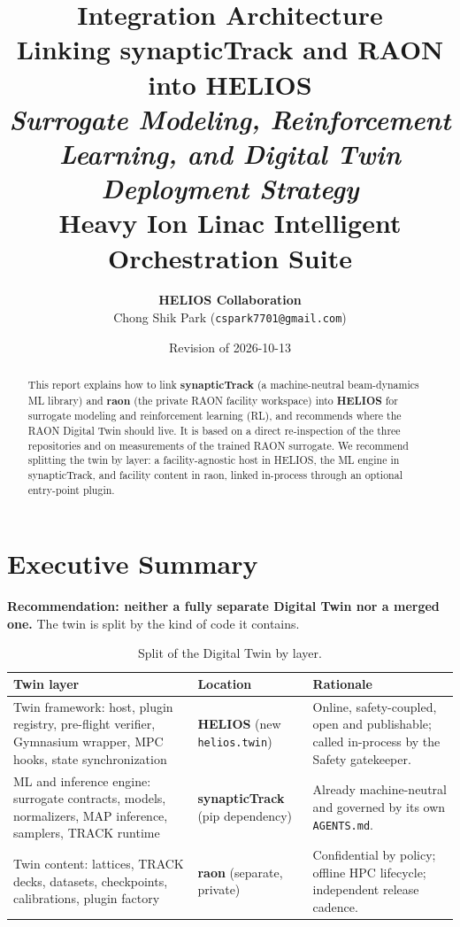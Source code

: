 \documentclass[11pt,a4paper]{article}
\title{
    \vspace{1cm}
    \Huge \textbf{Integration Architecture} \\
    \Large \textbf{Linking synapticTrack and RAON into HELIOS} \\
    \vspace{0.5cm}
    \normalsize \textit{Surrogate Modeling, Reinforcement Learning, and Digital Twin Deployment Strategy} \\
    \large Heavy Ion Linac Intelligent Orchestration Suite
    \vspace{1cm}
}
\author{\textbf{HELIOS Collaboration} \\ Chong Shik Park (\texttt{cspark7701@gmail.com})}
\date{Revision of 2026-10-13}
\newcommand{\tc}[1]{\texttt{\hbadness=10000 #1}}
\begin{document}
\sloppy
\maketitle

\begin{abstract}
This report explains how to link \textbf{synapticTrack} (a machine-neutral beam-dynamics ML library) and \textbf{raon} (the private RAON facility workspace) into \textbf{HELIOS} for surrogate modeling and reinforcement learning (RL), and recommends where the RAON Digital Twin should live. It is based on a direct re-inspection of the three repositories and on measurements of the trained RAON surrogate. We recommend splitting the twin by layer: a facility-agnostic host in HELIOS, the ML engine in synapticTrack, and facility content in raon, linked in-process through an optional entry-point plugin.
\end{abstract}

\tableofcontents
\newpage

\section{Executive Summary}

\textbf{Recommendation: neither a fully separate Digital Twin nor a merged one.} The twin is split by the kind of code it contains.

\begin{table}[ht]
\centering
\small
\begin{tabularx}{\textwidth}{L{3.6cm}L{3.4cm}Y}
\toprule
\textbf{Twin layer} & \textbf{Location} & \textbf{Rationale} \\
\midrule
Twin framework: host, plugin registry, pre-flight verifier, Gymnasium wrapper, MPC hooks, state synchronization & \textbf{HELIOS} (new \tc{helios.twin}) & Online, safety-coupled, open and publishable; called in-process by the Safety gatekeeper. \\
\addlinespace
ML and inference engine: surrogate contracts, models, normalizers, MAP inference, samplers, TRACK runtime & \textbf{synapticTrack} (pip dependency) & Already machine-neutral and governed by its own \tc{AGENTS.md}. \\
\addlinespace
Twin content: lattices, TRACK decks, datasets, checkpoints, calibrations, plugin factory & \textbf{raon} (separate, private) & Confidential by policy; offline HPC lifecycle; independent release cadence. \\
\bottomrule
\end{tabularx}
\caption{Split of the Digital Twin by layer.}
\end{table}
\end{document}
